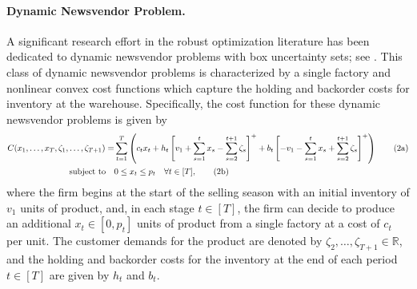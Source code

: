 \documentclass[nonblindrev,mnsc]{informs3} %
\def\Real{\mathbb{R}}
\let\R\Real
\begin{document}






\paragraph{Dynamic Newsvendor Problem. } 
A significant research effort in the robust optimization literature has been dedicated to {dynamic newsvendor problems} with box uncertainty sets; see  \cite{ben2005retailer,bertsimas2010optimality,iancu2013supermodularity}. This class of dynamic newsvendor problems is characterized by a single factory and nonlinear convex cost functions which capture the holding and backorder costs for inventory at the warehouse. Specifically, the cost function for these dynamic newsvendor problems is given by 
\begin{align} 
C(x_1,\ldots,x_T, \zeta_1,\ldots,\zeta_{T+1}) =  &  \sum_{t=1}^T \left(  c_{t} x_{t} +  h_t \left[ v_1 + \sum_{s=1}^t x_{s} - \sum_{s=2}^{t+1} \zeta_s \right]^+  + b_t \left[ -v_1 - \sum_{s=1}^t x_{s} + \sum_{s=2}^{t+1} \zeta_s \right]^+ \right) \tag{2a} \label{prob:example3:a} \\
\textnormal{subject to}\quad &0 \le x_{t} \le  p_{t} \quad \forall  t \in [T],  \tag{2b} \label{prob:example3:b}
\end{align}
 where the firm begins at the start of the selling season with an initial inventory  of $v_1$ units of product, and, in each stage $t \in [T]$, the firm can decide to produce an additional $x_{t} \in [0,p_{t}]$ units of product from a single  factory at a cost of $c_{t}$ per unit. The customer demands for the product are denoted by  $\zeta_2,\ldots,\zeta_{T+1} \in \R$, and  the holding and backorder costs for the inventory at the end of each period $t \in [T]$ are given by $h_t$ and $b_t$. 
\end{document}
